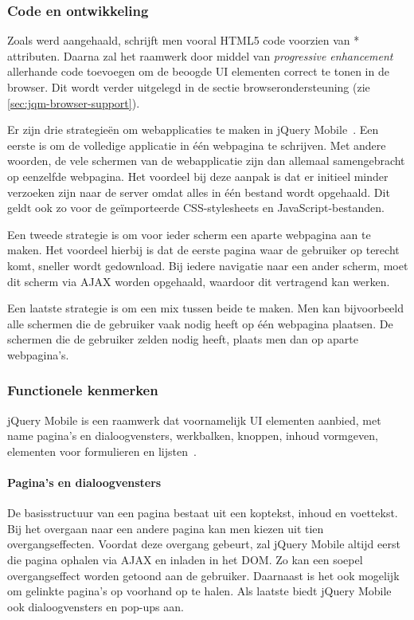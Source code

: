\subsubsection{Code en ontwikkeling}
Zoals werd aangehaald, schrijft men vooral HTML5 code voorzien van * attributen. Daarna zal het raamwerk door middel van \emph{progressive enhancement} allerhande code toevoegen om de beoogde UI elementen correct te tonen in de browser. Dit wordt verder uitgelegd in de sectie browserondersteuning (zie \ref{sec:jqm-browser-support}).

Er zijn drie strategieën om webapplicaties te maken in jQuery Mobile~\cite{Broulik2012}. Een eerste is om de volledige applicatie in één webpagina te schrijven. Met andere woorden,  de vele schermen van de webapplicatie zijn dan allemaal samengebracht op eenzelfde webpagina. Het voordeel bij deze aanpak is dat er initieel minder verzoeken zijn naar de server omdat alles in één bestand wordt opgehaald. Dit geldt ook zo voor de geïmporteerde CSS-stylesheets en JavaScript-bestanden. 

Een tweede strategie is om voor ieder scherm een aparte webpagina aan te maken. Het voordeel hierbij is dat de eerste pagina waar de gebruiker op terecht komt, sneller wordt gedownload. Bij iedere navigatie naar een ander scherm, moet dit scherm via AJAX worden opgehaald, waardoor dit vertragend kan werken. 

Een laatste strategie is om een mix tussen beide te maken. Men kan bijvoorbeeld alle schermen die de gebruiker vaak nodig heeft op één webpagina plaatsen. De schermen die de gebruiker zelden nodig heeft, plaats men dan op aparte webpagina's.  

\subsubsection{Functionele kenmerken}
jQuery Mobile is een raamwerk dat voornamelijk UI elementen aanbied, met name pagina's en dialoogvensters, werkbalken, knoppen, inhoud vormgeven, elementen voor formulieren en lijsten~\cite{JQuery2012b}.

\paragraph{Pagina's en dialoogvensters}
De basisstructuur van een pagina bestaat uit een koptekst, inhoud en voettekst. Bij het overgaan naar een andere pagina kan men kiezen uit tien overgangseffecten. Voordat deze overgang gebeurt, zal jQuery Mobile altijd eerst die pagina ophalen via AJAX en inladen in het DOM. Zo kan een soepel overgangseffect worden getoond aan de gebruiker. Daarnaast is het ook mogelijk om gelinkte pagina's op voorhand op te halen. Als laatste biedt jQuery Mobile ook dialoogvensters en pop-ups aan. 

